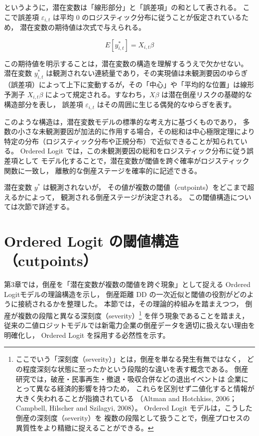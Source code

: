 というように，潜在変数は「線形部分」と「誤差項」の和として表される。
ここで誤差項 $\varepsilon_{i,t}$ は平均 0 のロジスティック分布に従うことが仮定されているため，
潜在変数の期待値は次式で与えられる。



\[
E[y^*_{i,t}] = X_{i,t}\beta
\]



この期待値を明示することは，潜在変数の構造を理解するうえで欠かせない。
潜在変数 $y^*_{i,t}$ は観測されない連続量であり，その実現値は未観測要因のゆらぎ
（誤差項）によって上下に変動するが，その「中心」や「平均的な位置」は線形予測子
$X_{i,t}\beta$ によって規定される。すなわち，$X\beta$ は潜在倒産リスクの基礎的な構造部分を表し，
誤差項 $\varepsilon_{i,t}$ はその周囲に生じる偶発的なゆらぎを表す。

このような構造は，潜在変数モデルの標準的な考え方に基づくものであり，
多数の小さな未観測要因が加法的に作用する場合，その総和は中心極限定理により
特定の分布（ロジスティック分布や正規分布）で近似できることが知られている。
Ordered Logit では，この未観測要因の総和をロジスティック分布に従う誤差項として
モデル化することで，潜在変数が閾値を跨ぐ確率がロジスティック関数に一致し，
離散的な倒産ステージを確率的に記述できる。

潜在変数 $y^*$ は観測されないが，
その値が複数の閾値（cutpoints）をどこまで超えるかによって，
観測される倒産ステージが決定される。
この閾値構造については次節で詳述する。



\section{Ordered Logit の閾値構造（cutpoints）}
\label{sec:ordered_cutpoints}

第3章では，倒産を「潜在変数が複数の閾値を跨ぐ現象」として捉える
Ordered Logitモデルの理論構造を示し，
倒産距離 DD の一次近似と閾値の役割がどのように接続されるかを整理した。
本節では，その理論的枠組みを踏まえつつ，
倒産が複数の段階と異なる深刻度（severity）\footnote{
ここでいう「深刻度（severity）」とは，倒産を単なる発生有無ではなく，
どの程度深刻な状態に至ったかという段階的な違いを表す概念である。
倒産研究では，破産・民事再生・撤退・吸収合併などの退出イベントは
企業にとって異なる経済的影響を持つため，
これらを区別せず二値化すると情報が大きく失われることが指摘されている
（Altman and Hotchkiss, 2006；Campbell, Hilscher and Szilagyi, 2008）。
Ordered Logit モデルは，こうした倒産の深刻度（severity）を
複数の段階として扱うことで，倒産プロセスの異質性をより精緻に捉えることができる。
}
を伴う現象であることを踏まえ，
従来の二値ロジットモデルでは新電力企業の倒産データを適切に扱えない理由を明確化し，
Ordered Logit を採用する必然性を示す。



